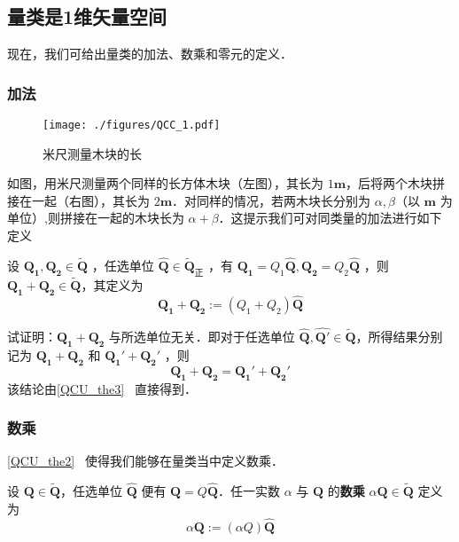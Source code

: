 \subsection{量类是1维矢量空间}
现在，我们可给出量类的加法、数乘和零元的定义．
\subsubsection{加法}
\begin{figure}[ht]
\centering
\texttt{[image: ./figures/QCC\_1.pdf]}
\caption{米尺测量木块的长} \label{QCC_fig1}
\end{figure}
如图，用米尺测量两个同样的长方体木块（左图），其长为 $1\boldsymbol{m}$，后将两个木块拼接在一起（右图），其长为 $2\boldsymbol{m}$．对同样的情况，若两木块长分别为 $\alpha ,\beta$（以 $\boldsymbol{m}$ 为单位）,则拼接在一起的木块长为 $\alpha+\beta$．这提示我们可对同类量的加法进行如下定义
\begin{definition}{}
设 $\boldsymbol{Q_1},\boldsymbol{Q_2}\in \tilde{\boldsymbol{Q}}$ ，任选单位 $\hat{\boldsymbol{Q}}\in\tilde{\boldsymbol{Q}}_{\text{正}}$ ，有 $\boldsymbol{Q_1}=Q_1\hat{\boldsymbol{Q}}, \boldsymbol{Q_2}=Q_2\hat{\boldsymbol{Q}}$ ，则 $\boldsymbol{Q_1}+\boldsymbol{Q_2}\in\tilde{\boldsymbol{Q}}$，其定义为
\begin{equation}
\boldsymbol{Q_1}+\boldsymbol{Q_2}:=(Q_1+Q_2)\hat{\boldsymbol{Q}}
\end{equation}
\end{definition}
\begin{example}{}
试证明：$\boldsymbol{Q_1}+\boldsymbol{Q_2}$ 与所选单位无关．即对于任选单位 $\hat{\boldsymbol{Q}},\hat{\boldsymbol{Q'}}\in\tilde{\boldsymbol{Q}}$，所得结果分别记为 $\boldsymbol{Q_1}+\boldsymbol{Q_2}$ 和 $\boldsymbol{Q_1}'+\boldsymbol{Q_2}'$ ，则
\begin{equation}
\boldsymbol{Q_1}+\boldsymbol{Q_2} =\boldsymbol{Q_1}'+\boldsymbol{Q_2}'
\end{equation}
 该结论由\autoref{QCU_the3}~ 直接得到．
\end{example}
\subsubsection{数乘}
\autoref{QCU_the2}~ 使得我们能够在量类当中定义数乘．
\begin{definition}{}
设 $\boldsymbol{Q}\in\tilde{\boldsymbol{Q}}$，任选单位 $\hat{\boldsymbol{Q}}$ 便有 $\boldsymbol{Q}=Q\hat{\boldsymbol{Q}}$．任一实数 $\alpha$ 与 $\boldsymbol{Q}$ 的\textbf{数乘} $\alpha\boldsymbol{Q}\in\tilde{\boldsymbol{Q}}$ 定义为
\begin{equation}
\alpha\boldsymbol{Q}:=(\alpha Q)\hat{\boldsymbol{Q}}
\end{equation}

\end{definition}
